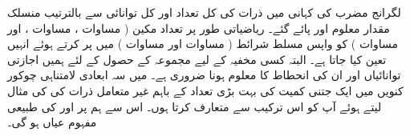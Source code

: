 لگرانج مضرب کی کہانی میں ذرات کی کل تعداد اور کل توانائی سے بالترتیب  منسلک   مقدار معلوم  اور  پائے  گئے۔   ریاضیاتی طور پر تعداد مکین ( مساوات ، مساوات ، اور مساوات  )     کو واپس مسلط شرائط ( مساوات  اور مساوات  )  میں پر کرتے ہوئے انہیں  تعین کیا جاتا ہے۔  البتہ کسی مخفیہ  کے لیے مجموعہ کے حصول  کے لئے  ہمیں اجازتی توانائیاں    اور ان کی انحطاط  کا معلوم ہونا ضروری ہے۔  میں سہ ابعادی لامتناہی چوکور کنویں  میں ایک جتنی کمیت کی بہت بڑی تعداد کے باہم غیر متعامل ذرات کی    کی مثال لیتے ہوئے آپ کو اس ترکیب سے متعارف کرتا ہوں۔  اس سے ہم پر  اور  کی طبیعی  مفہوم عیاں ہو گی۔ 

